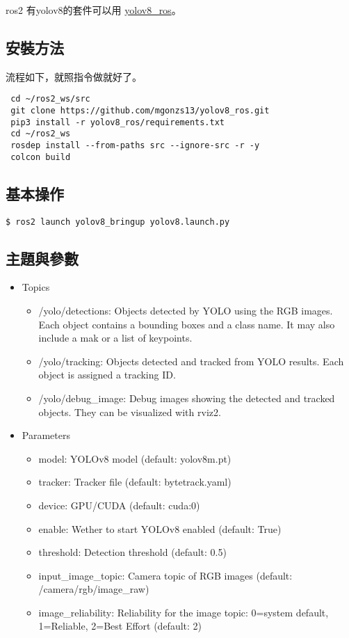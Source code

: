 ros2 有yolov8的套件可以用
\href{https://github.com/mgonzs13/yolov8_ros/tree/main}{yolov8\_ros}。
\subsection{安裝方法}
流程如下，就照指令做就好了。
\begin{tcolorbox}
\begin{verbatim}
 cd ~/ros2_ws/src
 git clone https://github.com/mgonzs13/yolov8_ros.git
 pip3 install -r yolov8_ros/requirements.txt
 cd ~/ros2_ws
 rosdep install --from-paths src --ignore-src -r -y
 colcon build
\end{verbatim}
\end{tcolorbox}
\subsection{基本操作}
\begin{tcolorbox}
\begin{verbatim}
$ ros2 launch yolov8_bringup yolov8.launch.py
\end{verbatim}
\end{tcolorbox}
\subsection{主題與參數}
\begin{itemize}
    \item Topics
    \begin{itemize}
        \item /yolo/detections: Objects detected by YOLO using the RGB images. Each object contains a bounding boxes and a class name. It may also include a mak or a list of keypoints.
        \item /yolo/tracking: Objects detected and tracked from YOLO results. Each object is assigned a tracking ID.
        \item /yolo/debug\_image: Debug images showing the detected and tracked objects. They can be visualized with rviz2.
    \end{itemize}
    \item Parameters
    \begin{itemize}
        \item model: YOLOv8 model (default: yolov8m.pt)
        \item tracker: Tracker file (default: bytetrack.yaml)
        \item device: GPU/CUDA (default: cuda:0)
        \item enable: Wether to start YOLOv8 enabled (default: True)
        \item threshold: Detection threshold (default: 0.5)
        \item input\_image\_topic: Camera topic of RGB images (default: /camera/rgb/image\_raw)
        \item  image\_reliability: Reliability for the image topic: 0=system default, 1=Reliable, 2=Best Effort (default: 2)
    \end{itemize}
\end{itemize}
